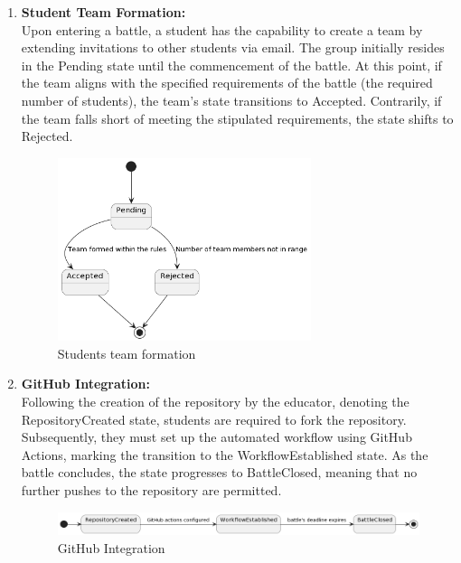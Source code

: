 \begin{enumerate}
    \item \textbf{Student Team Formation:} \\
    Upon entering a battle, a student has the capability to create a team by extending invitations to other students via email. The group initially resides in the Pending state until the commencement of the battle. At this point, if the team aligns with the specified requirements of the battle (the required number of students), the team's state transitions to Accepted. Contrarily, if the team falls short of meeting the stipulated requirements, the state shifts to Rejected.
    
        \begin{figure}[h!]
              \centering
              \includegraphics[width=0.7\textwidth]{Images/TeamFormation.png}
              \caption{Students team formation}
              \label{fig:CKBLifecycle}
        \end{figure}

    \item \textbf{GitHub Integration:} \\
    Following the creation of the repository by the educator, denoting the RepositoryCreated state, students are required to fork the repository. Subsequently, they must set up the automated workflow using GitHub Actions, marking the transition to the WorkflowEstablished state. As the battle concludes, the state progresses to BattleClosed, meaning that no further pushes to the repository are permitted.
        \begin{figure}[h!]
              \centering
              \includegraphics[width=1\textwidth]{Images/GitHubConfiguration.png}
              \caption{GitHub Integration}
              \label{fig:CKBLifecycle}
        \end{figure}
    


\end{enumerate}
